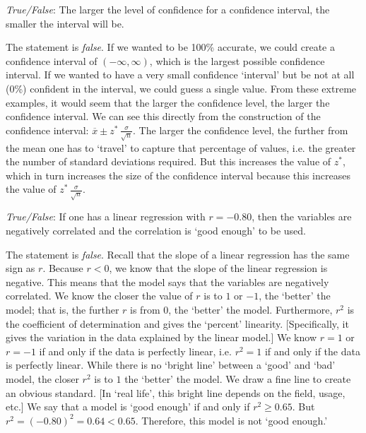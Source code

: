 \documentclass[11pt,letterpaper]{article}
\begin{document}
\quizsol \textit{True/False}: The larger the level of confidence for a confidence interval, the smaller the interval will be. \pspace

\sol The statement is \textit{false}. If we wanted to be 100\% accurate, we could create a confidence interval of $(-\infty, \infty)$, which is the largest possible confidence interval. If we wanted to have a very small confidence `interval' but be not at all (0\%) confident in the interval, we could guess a single value. From these extreme examples, it would seem that the larger the confidence level, the larger the confidence interval. We can see this directly from the construction of the confidence interval: $\overline{x} \pm z^* \, \frac{\sigma}{\sqrt{n}}$. The larger the confidence level, the further from the mean one has to `travel' to capture that percentage of values, i.e. the greater the number of standard deviations required. But this increases the value of $z^*$, which in turn increases the size of the confidence interval because this increases the value of $z^* \, \frac{\sigma}{\sqrt{n}}$. \pvspace{1.3cm}



\quizsol \textit{True/False}: If one has a linear regression with $r= -0.80$, then the variables are negatively correlated and the correlation is `good enough' to be used. \pspace

\sol The statement is \textit{false}. Recall that the slope of a linear regression has the same sign as $r$. Because $r < 0$, we know that the slope of the linear regression is negative. This means that the model says that the variables are negatively correlated. We know the closer the value of $r$ is to $1$ or $-1$, the `better' the model; that is, the further $r$ is from $0$, the `better' the model. Furthermore, $r^2$ is the coefficient of determination and gives the `percent' linearity. [Specifically, it gives the variation in the data explained by the linear model.] We know $r= 1$ or $r= -1$ if and only if the data is perfectly linear, i.e. $r^2= 1$ if and only if the data is perfectly linear. While there is no `bright line' between a `good' and `bad' model, the closer $r^2$ is to $1$ the `better' the model. We draw a fine line to create an obvious standard. [In `real life', this bright line depends on the field, usage, etc.] We say that a model is `good enough' if and only if $r^2 \geq 0.65$. But $r^2= (-0.80)^2= 0.64 < 0.65$. Therefore, this model is not `good enough.' \pvspace{1.3cm}
\end{document}
